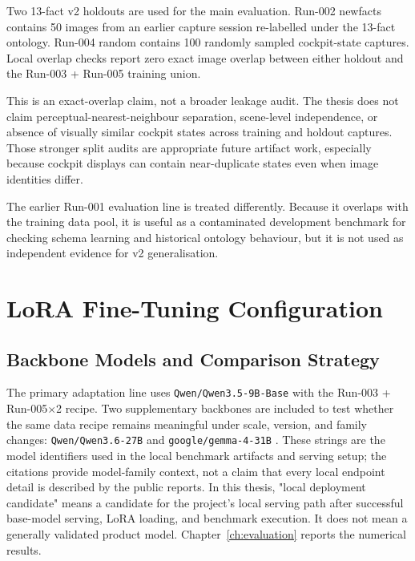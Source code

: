 Two 13-fact v2 holdouts are used for the main evaluation. Run-002 newfacts
contains 50 images from an earlier capture session re-labelled under the
13-fact ontology. Run-004 random contains 100 randomly sampled cockpit-state
captures. Local overlap checks report zero exact image overlap between either
holdout and the Run-003 + Run-005 training union.

This is an exact-overlap claim, not a broader leakage audit. The thesis does
not claim perceptual-nearest-neighbour separation, scene-level independence, or
absence of visually similar cockpit states across training and holdout
captures. Those stronger split audits are appropriate future artifact work,
especially because cockpit displays can contain near-duplicate states even when
image identities differ.

The earlier Run-001 evaluation line is treated differently. Because it overlaps
with the training data pool, it is useful as a contaminated development
benchmark for checking schema learning and historical ontology behaviour, but
it is not used as independent evidence for v2 generalisation.

\section{LoRA Fine-Tuning Configuration}\label{sec:method-lora-config}

\subsection{Backbone Models and Comparison Strategy}

The primary adaptation line uses \texttt{Qwen/Qwen3.5-9B-Base} with the
Run-003 + Run-005$\times$2 recipe. Two supplementary backbones are included to
test whether the same data recipe remains meaningful under scale, version, and
family changes: \texttt{Qwen/Qwen3.6-27B} and \texttt{google/gemma-4-31B}
\citep{gemma2024,gemma32025}. These strings are the model identifiers used in
the local benchmark artifacts and serving setup; the citations provide
model-family context, not a claim that every local endpoint detail is described
by the public reports. In this thesis, "local deployment candidate" means a
candidate for the project's local serving path after successful base-model
serving, LoRA loading, and benchmark execution. It does not mean a generally
validated product model. Chapter~\ref{ch:evaluation} reports the numerical
results.

